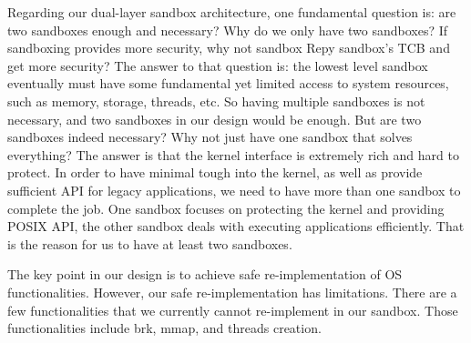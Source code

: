 Regarding our dual-layer sandbox architecture, one fundamental question is: are two sandboxes 
enough and necessary? Why do we only have two sandboxes? If sandboxing provides more security, 
why not sandbox Repy sandbox's TCB and get more security? The answer to that question is: 
the lowest level sandbox eventually must have some fundamental yet limited access to system resources, 
such as memory, storage, threads, etc. So having multiple sandboxes is not necessary, and two sandboxes in 
our design would be enough. But are two sandboxes indeed necessary? Why not just have one sandbox 
that solves everything? The answer is that the kernel interface is extremely rich and hard to protect. 
In order to have minimal tough into the kernel, as well as provide sufficient API for legacy applications, 
we need to have more than one sandbox to complete the job. One sandbox focuses on protecting 
the kernel and providing POSIX API, the other sandbox deals with executing applications efficiently. 
That is the reason for us to have at least two sandboxes.  

The key point in our design is to achieve safe re-implementation of OS functionalities. 
However, our safe re-implementation has limitations. There are a few functionalities that 
we currently cannot re-implement in our sandbox. Those functionalities include brk, mmap, and threads creation.